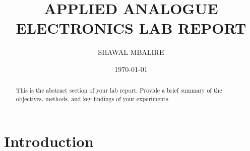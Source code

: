 \documentclass{article}
\title{APPLIED ANALOGUE ELECTRONICS LAB REPORT}
\author{SHAWAL MBALIRE}
\date{\today}
\begin{document}
\maketitle
\newpage

\begin{abstract}
    This is the abstract section of your lab report. Provide a brief summary of the objectives, methods, and key findings of your experiments.
\end{abstract}

\section{Introduction}



\end{document}
